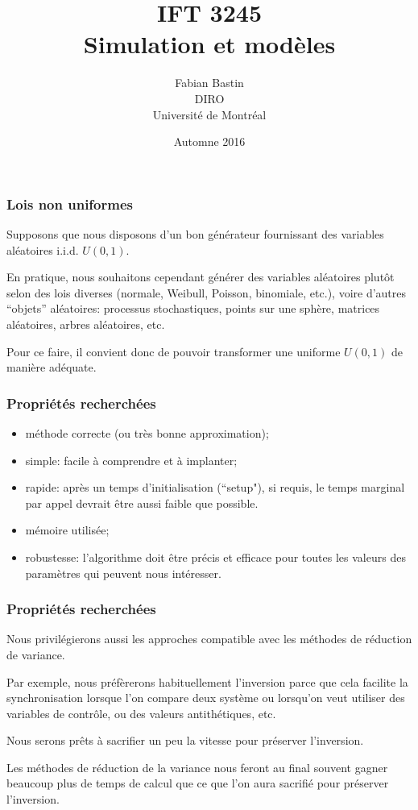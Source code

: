 \documentclass[t,usepdftitle=false]{beamer}
\title[IFT3245]{IFT 3245\\Simulation et modèles}
\author[Fabian Bastin]{Fabian Bastin\\DIRO\\Université de Montréal}
\date{Automne 2016}
\begin{document}
\frame{\titlepage}

\begin{frame}
\frametitle{Lois non uniformes}

Supposons que nous disposons d'un bon générateur fournissant des
variables aléatoires i.i.d. $U (0, 1)$.

\mbox{}

En pratique, nous souhaitons cependant générer des variables
aléatoires plutôt selon des lois diverses (normale, Weibull, Poisson, binomiale, etc.), voire d'autres ``objets'' aléatoires: processus stochastiques, points sur une sphère, matrices aléatoires, arbres aléatoires, etc.

\mbox{}

Pour ce faire, il convient donc de pouvoir transformer une uniforme
$U(0,1)$ de manière adéquate.

\end{frame}

\begin{frame}
\frametitle{Propriétés recherchées}

\begin{itemize}
\item
méthode correcte (ou très bonne approximation);
\item
simple: facile à comprendre et à implanter;
\item
rapide: après un temps d'initialisation (``setup"), si requis, le temps marginal
par appel devrait être aussi faible que possible.
\item
mémoire utilisée;
\item
robustesse: l'algorithme doit être précis et efficace pour toutes les
valeurs des paramètres qui peuvent nous intéresser.
\end{itemize}

\end{frame}

\begin{frame}
\frametitle{Propriétés recherchées}

Nous privilégierons aussi les approches compatible avec les méthodes
de réduction de variance.

\mbox{}

Par exemple, nous préfèrerons habituellement l'inversion parce que
cela facilite la synchronisation lorsque l'on compare deux système ou
lorsqu'on veut utiliser des variables de contrôle, ou des valeurs
antithétiques, etc.

\mbox{}

Nous serons prêts à sacrifier un peu la vitesse pour préserver
l'inversion.

\mbox{}

Les méthodes de réduction de la variance nous feront au final souvent
gagner beaucoup plus de temps de calcul que ce que l'on aura sacrifié
pour préserver l'inversion.

\end{frame}
\end{document}
